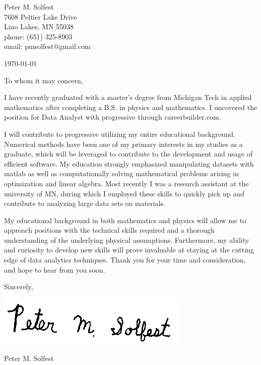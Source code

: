 \documentclass[letterpaper,12pt]{article}
\begin{document}
Peter M. Solfest\\
7608 Peltier Lake Drive\\
Lino Lakes, MN 55038\\
phone: (651) 325-8903\\
email: pmsolfest@gmail.com

\today


To whom it may concern, %

I have recently graduated with a master's degree from Michigan Tech in applied mathematics after
completing a B.S. in physics and mathematics.
I uncovered the position for Data Analyst with progressive through careerbuilder.com.


I will contribute to progressive utilizing my entire educational background.
Numerical methods have been one of my primary interests in my studies as a graduate,
which will be leveraged to contribute to the development and usage of efficient software.
My education strongly emphasized manipulating datasets with matlab as well as
computationally solving mathematical problems arising in optimization and linear algebra.
Most recently I was a research assistant at the university of MN, during which I employed
these skills to quickly pick up and contribute to analyzing large data sets on materials.

My educational background in both mathematics and physics will allow 
me to approach positions with the technical skills required and a thorough understanding
of the underlying physical assumptions.
Furthermore, my ability and curiosity to develop new skills will prove invaluable
at staying at the cutting edge of data analytics techniques.
Thank you for your time and consideration, and hope to hear from you soon.

Sincerely,

\includegraphics[height=.5in]{signature.png}

Peter M. Solfest
\end{document}
